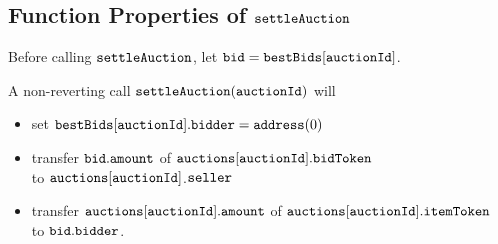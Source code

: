 \documentclass[a4paper,10pt]{article}
\begin{document}
\subsection*{Function Properties of $\texttt{settleAuction}$}

Before calling $\texttt{settleAuction}$, let $\texttt{bid} = \texttt{bestBids}[\texttt{auctionId}]$.

A non-reverting call $\texttt{settleAuction}(\texttt{auctionId})$ will
\begin{itemize}
\item set $\texttt{bestBids}[\texttt{auctionId}].\texttt{bidder} = \texttt{address}(0)$
\item transfer $\texttt{bid}.\texttt{amount}$ of $\texttt{auctions}[\texttt{auctionId}].\texttt{bidToken}$ \\
to $\texttt{auctions}[\texttt{auctionId}]$.$\texttt{seller}$
\item transfer $\texttt{auctions}[\texttt{auctionId}].\texttt{amount}$ of $\texttt{auctions}[\texttt{auctionId}].\texttt{itemToken}$ \\
to $\texttt{bid}.\texttt{bidder}$.
\end{itemize}
\end{document}
